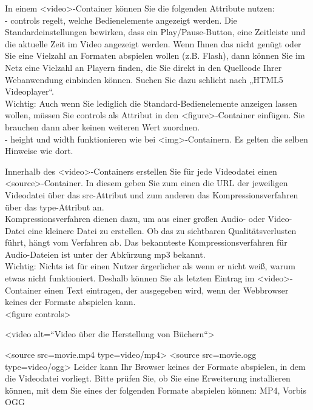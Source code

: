 In einem <video>-Container können Sie die folgenden Attribute nutzen:\\

-	controls regelt, welche Bedienelemente angezeigt werden. Die Standardeinstellungen bewirken, dass ein Play/Pause-Button, eine Zeitleiste und die aktuelle Zeit im Video angezeigt werden. Wenn Ihnen das nicht genügt oder Sie eine Vielzahl an Formaten abspielen wollen (z.B. Flash), dann können Sie im Netz eine Vielzahl an Playern finden, die Sie direkt in den Quellcode Ihrer Webanwendung einbinden können. Suchen Sie dazu schlicht nach „HTML5 Videoplayer“.\\

Wichtig: Auch wenn Sie lediglich die Standard-Bedienelemente anzeigen lassen wollen, müssen Sie controls als Attribut in den <figure>-Container einfügen. Sie brauchen dann aber keinen weiteren Wert zuordnen.\\

-	height und width funktionieren wie bei <img>-Containern. Es gelten die selben Hinweise wie dort.

Innerhalb des <video>-Containers erstellen Sie für jede Videodatei einen <source>-Container. In diesem geben Sie zum einen die URL der jeweiligen Videodatei über das src-Attribut und zum anderen das Kompressionsverfahren über das type-Attribut an.\\

Kompressionsverfahren dienen dazu, um aus einer großen Audio- oder Video-Datei eine kleinere Datei zu erstellen. Ob das zu sichtbaren Qualitätsverlusten führt, hängt vom Verfahren ab. Das bekannteste Kompressionsverfahren für Audio-Dateien ist unter der Abkürzung mp3 bekannt.\\

Wichtig: Nichts ist für einen Nutzer ärgerlicher als wenn er nicht weiß, warum etwas nicht funktioniert. Deshalb können Sie als letzten Eintrag im <video>-Container einen Text eintragen, der ausgegeben wird, wenn der Webbrowser keines der Formate abspielen kann.\\


<figure controls>

<video alt=“Video über die Herstellung von Büchern“>

<source src=movie.mp4 type=video/mp4>
<source src=movie.ogg type=video/ogg>
Leider kann Ihr Browser keines der Formate abspielen, in dem die Videodatei vorliegt. Bitte prüfen Sie, ob Sie eine Erweiterung installieren können, mit dem Sie eines der folgenden Formate abspielen können: MP4, Vorbis OGG

